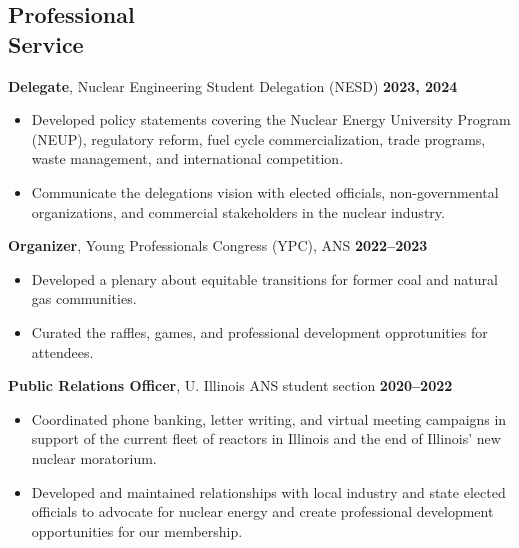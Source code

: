 \documentclass[margin,line]{resume}
\begin{document}
\begin{resume}
    \section{\mysidestyle Professional\\Service}
    \textbf{Delegate}, Nuclear Engineering Student Delegation (NESD) \hfill \textbf{2023, 2024}\vspace{.5mm}\\%
    \begin{itemize}
        \item Developed policy statements covering the Nuclear Energy University Program (NEUP), regulatory reform, fuel cycle commercialization, trade programs, waste management, and international competition.
        \item Communicate the delegations vision with elected officials, non-governmental organizations, and commercial stakeholders in the nuclear industry.
    \end{itemize}
    \textbf{Organizer}, Young Professionals Congress (YPC), ANS \hfill \textbf{2022--2023}\vspace{.5mm}\\%
    \begin{itemize}
        \item Developed a plenary about equitable transitions for former coal and natural gas communities.
        \item Curated the raffles, games, and professional development opprotunities for attendees.
    \end{itemize}
    \textbf{Public Relations Officer}, U. Illinois ANS student section  \hfill \textbf{2020--2022}\vspace{.5mm}\\%
    \begin{itemize}
        \item Coordinated phone banking, letter writing, and virtual meeting campaigns in support of the current fleet of reactors in Illinois and the end of Illinois' new nuclear moratorium.
        \item Developed and maintained relationships with local industry and state elected officials to advocate for nuclear energy and create professional development opportunities for our membership.
    \end{itemize}

\end{resume}
\end{document}
